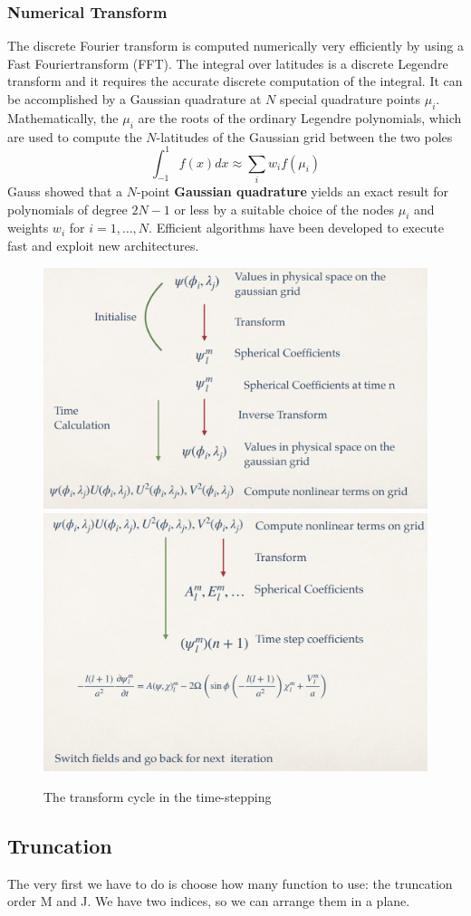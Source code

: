 \subsubsection{Numerical Transform}
The discrete Fourier transform is computed numerically very efficiently by using a Fast Fouriertransform (FFT).
The integral over latitudes is a discrete Legendre transform and it requires the accurate discrete computation of the integral. It can be accomplished by a Gaussian
quadrature at $N$ special quadrature points $\mu_i$. Mathematically, the $\mu_i$ are the roots of the ordinary Legendre polynomials, which are used to compute the $N$-latitudes of the Gaussian grid between the two poles
$$\int_{-1}^1 f(x)dx\approx\displaystyle\sum_iw_if(\mu_i)$$
Gauss showed that a $N$-point \textbf{Gaussian quadrature} yields an exact result for polynomials of degree $2N-1$ or less by a suitable choice of the nodes $\mu_i$ and weights $w_i$ for $i=1,\dots,N$. Efficient algorithms have been developed to execute fast and exploit new architectures.
\begin{figure}[htpb]
	\centering
	\includegraphics[width=0.5\linewidth]{uploads/Screenshot 2024-11-19 125912.png}\quad\includegraphics[width=0.5\linewidth]{uploads/Screenshot 2024-11-19 130025.png}
	\caption{The transform cycle in the time-stepping}
	\label{fig:transform cycle}
\end{figure}




\subsection{Truncation}
The very first we have to do is choose how many function to
use: the truncation order M and J. We have two indices, so
we can arrange them in a plane.

